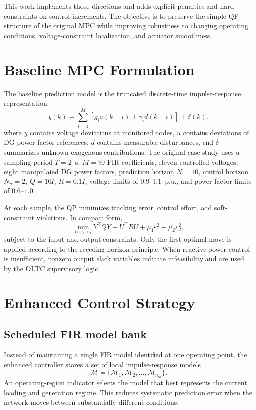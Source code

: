 \documentclass[10pt,twocolumn]{article}
\begin{document}
This work implements those directions and adds explicit penalties and hard constraints on control increments. The objective is to preserve the simple QP structure of the original MPC while improving robustness to changing operating conditions, voltage-constraint localization, and actuator smoothness.

\section{Baseline MPC Formulation}
The baseline prediction model is the truncated discrete-time impulse-response representation
\begin{equation}
y(k)=\sum_{i=1}^{M}\left[g_i u(k-i)+\gamma_i d(k-i)\right]+\delta(k),
\end{equation}
where $y$ contains voltage deviations at monitored nodes, $u$ contains deviations of DG power-factor references, $d$ contains measurable disturbances, and $\delta$ summarizes unknown exogenous contributions. The original case study uses a sampling period $T=2$~s, $M=90$ FIR coefficients, eleven controlled voltages, eight manipulated DG power factors, prediction horizon $N=10$, control horizon $N_u=2$, $Q=10I$, $R=0.1I$, voltage limits of $0.9$--$1.1$~p.u., and power-factor limits of $0.6$--$1.0$.

At each sample, the QP minimizes tracking error, control effort, and soft-constraint violations. In compact form,
\begin{equation}
\min_{U,\varepsilon_1,\varepsilon_2}
Y^\top QY+U^\top RU+\mu_1\varepsilon_1^2+\mu_2\varepsilon_2^2,
\end{equation}
subject to the input and output constraints. Only the first optimal move is applied according to the receding-horizon principle. When reactive-power control is insufficient, nonzero output slack variables indicate infeasibility and are used by the OLTC supervisory logic.

\section{Enhanced Control Strategy}
\subsection{Scheduled FIR model bank}
Instead of maintaining a single FIR model identified at one operating point, the enhanced controller stores a set of local impulse-response models
\begin{equation}
\mathcal{M}=\{\mathcal{M}_1,\mathcal{M}_2,\ldots,\mathcal{M}_{n_m}\}.
\end{equation}
An operating-region indicator selects the model that best represents the current loading and generation regime. This reduces systematic prediction error when the network moves between substantially different conditions.
\end{document}
